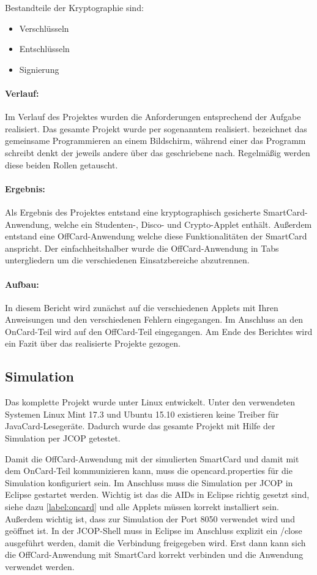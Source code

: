 Bestandteile der Kryptographie sind:
\begin{itemize}
	\item Verschlüsseln
	\item Entschlüsseln
	\item Signierung
\end{itemize}

\paragraph{Verlauf:}
Im Verlauf des Projektes wurden die Anforderungen entsprechend der Aufgabe realisiert.
Das gesamte Projekt wurde per sogenanntem  realisiert.
 bezeichnet das gemeinsame Programmieren an einem Bildschirm, während einer das Programm schreibt denkt der jeweils andere über das geschriebene nach.
Regelmäßig werden diese beiden Rollen getauscht.

\paragraph{Ergebnis:}
Als Ergebnis des Projektes entstand eine kryptographisch gesicherte SmartCard-Anwendung, welche ein Studenten-, Disco- und Crypto-Applet enthält.
Außerdem entstand eine OffCard-Anwendung welche diese Funktionalitäten der SmartCard anspricht.
Der einfachheitshalber wurde die OffCard-Anwendung in Tabs untergliedern um die verschiedenen Einsatzbereiche abzutrennen.

\paragraph{Aufbau:}
In diesem Bericht wird zunächst auf die verschiedenen Applets mit Ihren Anweisungen und den verschiedenen Fehlern eingegangen.
Im Anschluss an den OnCard-Teil wird auf den OffCard-Teil eingegangen.
Am Ende des Berichtes wird ein Fazit über das realisierte Projekte gezogen.

\subsection{Simulation}
\label{label:simulation}
Das komplette Projekt wurde unter Linux entwickelt.
Unter den verwendeten Systemen Linux Mint 17.3 und Ubuntu 15.10 existieren keine Treiber für JavaCard-Lesegeräte.
Dadurch wurde das gesamte Projekt mit Hilfe der Simulation per JCOP getestet.

Damit die OffCard-Anwendung mit der simulierten SmartCard und damit mit dem OnCard-Teil kommunizieren kann, muss die opencard.properties für die Simulation konfiguriert sein.
Im Anschluss muss die Simulation per JCOP in Eclipse gestartet werden.
Wichtig ist das die AIDs in Eclipse richtig gesetzt sind, siehe dazu \autoref{label:oncard} und alle Applets müssen korrekt installiert sein.
Außerdem wichtig ist, dass zur Simulation der Port 8050 verwendet wird und geöffnet ist.
In der JCOP-Shell muss in Eclipse im Anschluss explizit ein /close ausgeführt werden, damit die Verbindung freigegeben wird.
Erst dann kann sich die OffCard-Anwendung mit SmartCard korrekt verbinden und die Anwendung verwendet werden.

